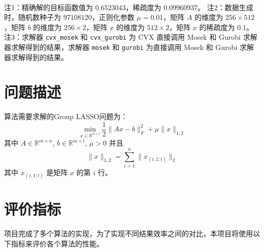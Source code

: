 \documentclass[journal, a4paper]{IEEEtran}
\begin{document}
\begin{table}[h!]
\begin{tabular}{lcccccccc}
\end{tabular}
\label{tab:all}
\newline \\
\raggedright
\footnotesize 
注1：精确解的目标函数值为 $0.6523043$，稀疏度为 $0.09960937$。
\newline
注2：数据生成时，随机数种子为 $97108120$，正则化参数 $\mu = 0.01$，矩阵 $A$ 的维度为 $256 \times 512$，矩阵 $b$ 的维度为 $256 \times 2$，矩阵 $x$ 的维度为 $512 \times 2$，矩阵 $x$ 的稀疏度为 $0.1$。
\newline
注3：求解器 \texttt{cvx\_mosek} 和 \texttt{cvx\_gurobi} 为 CVX 直接调用 Mosek 和 Gurobi 求解器求解得到的结果，求解器 \texttt{mosek} 和 \texttt{gurobi} 为直接调用 Mosek 和 Gurobi 求解器求解得到的结果。
\end{table}

\section{\textbf{问题描述}}
算法需要求解的Group LASSO问题为：
\begin{equation}\label{eq:prob}
    \min _{x \in \mathbb{R}^{n \times l}} \frac{1}{2}\|A x-b\|_F^2+\mu\|x\|_{1,2}
\end{equation}
其中 $A \in \mathbb{R}^{m \times n}$, $b \in \mathbb{R}^{m \times l}$, $\mu>0$ 并且
$$
\|x\|_{1,2}=\sum_{i=1}^n\|x_{(i, 1: l)}\|_2
$$
其中 $x_{(i, 1: l)}$ 是矩阵 $x$ 的第 $i$ 行。

\section{\textbf{评价指标}}

项目完成了多个算法的实现，为了实现不同结果效率之间的对比，本项目将使用以下指标\cite{wzwProblem}来评价各个算法的性能。
\end{document}
